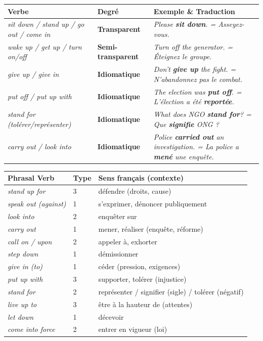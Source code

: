 \documentclass[11pt]{article}
\newcommand{\eng}[1]{\ifmmode\text{\textit{#1}}\else\begingroup\selectlanguage{english}\itshape #1\endgroup\fi}
\begin{document}
\begin{center}
\begin{tabularx}{\linewidth}{|X|X|X|}
\hline
\rowcolor{popblueL}
\textbf{Verbe} & \textbf{Degré} & \textbf{Exemple \& Traduction} \\
\hline
\eng{sit down} / \eng{stand up} / \eng{go out} / \eng{come in} & \textbf{Transparent} & \eng{Please \textbf{sit down}.} = Asseyez-vous. \\
\eng{wake up} / \eng{get up} / \eng{turn on/off} & \textbf{Semi-transparent} & \eng{Turn off the generator.} = Éteignez le groupe. \\
\hline
\eng{give up} / \eng{give in} & \textbf{Idiomatique} & \eng{Don't \textbf{give up} the fight.} = N'abandonnez pas le combat. \\
\eng{put off} / \eng{put up with} & \textbf{Idiomatique} & \eng{The election was \textbf{put off}.} = L'élection a été \textbf{reportée}. \\
\eng{stand for} (tolérer/représenter) & \textbf{Idiomatique} & \eng{What does NGO \textbf{stand for}?} = Que \textbf{signifie} ONG ? \\
\eng{carry out} / \eng{look into} & \textbf{Idiomatique} & \eng{Police \textbf{carried out} an investigation.} = La police a \textbf{mené} une enquête. \\
\hline
\end{tabularx}
\end{center}

\begin{aretenir}
\begin{center}
\begin{tabularx}{\linewidth}{|l|l|X|}
\hline
\rowcolor{popblueL}
\textbf{Phrasal Verb} & \textbf{Type} & \textbf{Sens français (contexte)} \\
\hline
\eng{stand up for} & 3 & défendre (droits, cause) \\
\eng{speak out (against)} & 1 & s'exprimer, dénoncer publiquement \\
\eng{look into} & 2 & enquêter sur \\
\eng{carry out} & 1 & mener, réaliser (enquête, réforme) \\
\eng{call on / upon} & 2 & appeler à, exhorter \\
\eng{step down} & 1 & démissionner \\
\eng{give in (to)} & 1 & céder (pression, exigences) \\
\eng{put up with} & 3 & supporter, tolérer (injustice) \\
\eng{stand for} & 2 & représenter / signifier (sigle) / tolérer (négatif) \\
\eng{live up to} & 3 & être à la hauteur de (attentes) \\
\eng{let down} & 1 & décevoir \\
\eng{come into force} & 2 & entrer en vigueur (loi) \\
\hline
\end{tabularx}
\end{center}
\end{aretenir}
\end{document}
